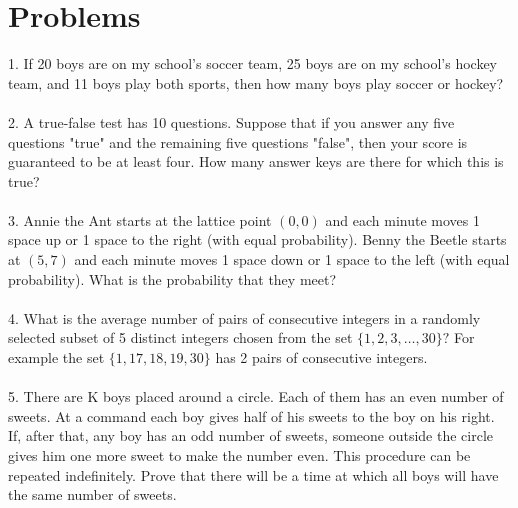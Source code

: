 \documentclass{article}
\begin{document}
\section*{Problems}
1. If 20 boys are on my school's soccer team, 25 boys are on my school's hockey team, and 11 boys play both sports, then how many boys play soccer or hockey? \\\\
2. A true-false test has 10 questions. Suppose that if you answer any five questions "true" and the remaining five questions "false", then your score is guaranteed to be at least four. How many answer keys are there for which this is true? \\\\
3. Annie the Ant starts at the lattice point $(0,0)$ and each minute moves 1 space up or 1 space to the right (with equal probability). Benny the Beetle starts at $(5,7)$ and each minute moves 1 space down or 1 space to the left (with equal probability). What is the probability that they meet? \\\\
4. What is the average number of pairs of consecutive integers in a randomly selected subset of 5 distinct integers chosen from the set $\{1, 2, 3,\ldots, 30\}?$ For example the set $\{1, 17, 18, 19, 30\}$ has 2 pairs of consecutive integers.\\\\
5.  There are K boys placed around a circle. Each of them has an
even number of sweets. At a command each boy gives half of his
sweets to the boy on his right. If, after that, any boy has an odd
number of sweets, someone outside the circle gives him one more
sweet to make the number even. This procedure can be repeated
indefinitely. Prove that there will be a time at which all boys will
have the same number of sweets.
\\\\
\end{document}
